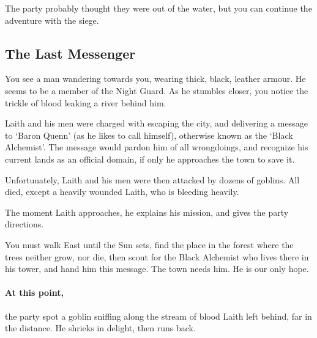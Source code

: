 \begin{multicols}{2}

The party probably thought they were out of the water, but you can continue the adventure with the siege.

\subsection{The Last Messenger}

\begin{boxtext}

	You see a man wandering towards you, wearing thick, black, leather armour.
	He seems to be a member of the Night Guard.
	As he stumbles closer, you notice the trickle of blood leaking a river behind him.

\end{boxtext}

\begin{exampletext}

	Laith and his men were charged with escaping the city, and delivering a message to `Baron Quenn' (as he likes to call himself), otherwise known as the `Black Alchemist'.
	The message would pardon him of all wrongdoings, and recognize his current lands as an official domain, if only he approaches the town to save it.

	Unfortunately, Laith and his men were then attacked by dozens of goblins.
	All died, except a heavily wounded Laith, who is bleeding heavily.

\end{exampletext}

The moment Laith approaches, he explains his mission, and gives the party directions.

\begin{speechtext}

	You must walk East until the Sun sets, find the place in the forest where the trees neither grow, nor die, then scout for the Black Alchemist who lives there in his tower, and hand him this message.
	The town needs him.
	He is our only hope.

\end{speechtext}

\paragraph{At this point,}
the party spot a goblin sniffing along the stream of blood Laith left behind, far in the distance.
He shrieks in delight, then runs back.


\end{multicols}
